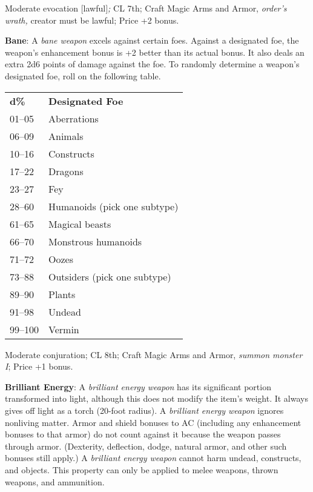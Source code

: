 Moderate evocation \mbox{$[$}lawful\mbox{$]$}\textit{; }CL 7th; Craft Magic Arms and Armor, \textit{order's wrath, }creator must be lawful; Price +2 bonus.
				
\textbf{Bane}: A \textit{bane weapon} excels against certain foes. Against a designated foe, the weapon's enhancement bonus is +2 better than its actual bonus. It also deals an extra 2d6 points of damage against the foe. To randomly determine a weapon's designated foe, roll on the following table.

\begin{tabular}{ll}
\textbf{d\%} & \textbf{Designated Foe}      \\
01--05        & Aberrations                  \\
06--09        & Animals                      \\
10--16        & Constructs                   \\
17--22        & Dragons                      \\
23--27        & Fey                          \\
28--60        & Humanoids (pick one subtype) \\
61--65        & Magical beasts               \\
66--70        & Monstrous humanoids          \\
71--72        & Oozes                        \\
73--88        & Outsiders (pick one subtype) \\
89--90        & Plants                       \\
91--98        & Undead                       \\
99--100       & Vermin                      \\
\end{tabular}
				
Moderate conjuration; CL 8th; Craft Magic Arms and Armor, \textit{summon monster I}; Price +1 bonus.
				
\textbf{Brilliant Energy}: A \textit{brilliant energy weapon} has its significant portion transformed into light, although this does not modify the item's weight. It always gives off light as a torch (20-foot radius). A \textit{brilliant energy weapon} ignores nonliving matter. Armor and shield bonuses to AC (including any enhancement bonuses to that armor) do not count against it because the weapon passes through armor. (Dexterity, deflection, dodge, natural armor, and other such bonuses still apply.) A \textit{brilliant energy weapon} cannot harm undead, constructs, and objects. This property can only be applied to melee weapons, thrown weapons, and ammunition.
				
